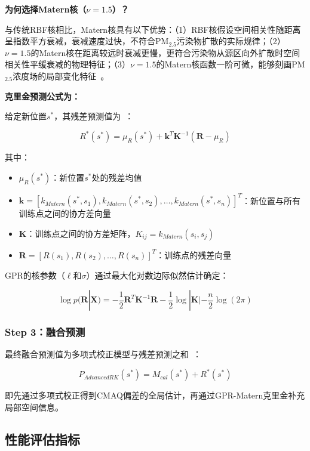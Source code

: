 \documentclass[UTF8, a4paper, 12pt]{article}
\begin{document}
\textbf{为何选择Matern核（$\nu=1.5$）？}

与传统RBF核相比，Matern核具有以下优势：（1）RBF核假设空间相关性随距离呈指数平方衰减，衰减速度过快，不符合PM$_{2.5}$污染物扩散的实际规律；（2）$\nu=1.5$的Matern核在距离较远时衰减更慢，更符合污染物从源区向外扩散时空间相关性平缓衰减的物理特征；（3）$\nu=1.5$的Matern核函数一阶可微，能够刻画PM$_{2.5}$浓度场的局部变化特征~\cite{rasmussen2006gaussian}。

\textbf{克里金预测公式为：}

给定新位置$s^*$，其残差预测值为~\cite{krige1951note}：

\begin{equation}
R^*(s^*) = \mu_R(s^*) + \mathbf{k}^T \mathbf{K}^{-1} (\mathbf{R} - \mu_R)
\end{equation}

其中：
\begin{itemize}
    \item $\mu_R(s^*)$：新位置$s^*$处的残差均值
    \item $\mathbf{k} = [k_{Matern}(s^*, s_1), k_{Matern}(s^*, s_2), \ldots, k_{Matern}(s^*, s_n)]^T$：新位置与所有训练点之间的协方差向量
    \item $\mathbf{K}$：训练点之间的协方差矩阵，$K_{ij} = k_{Matern}(s_i, s_j)$
    \item $\mathbf{R} = [R(s_1), R(s_2), \ldots, R(s_n)]^T$：训练点的残差向量
\end{itemize}

GPR的核参数（$\ell$和$\sigma$）通过最大化对数边际似然估计确定：

\begin{equation}
\log p(\mathbf{R} | \mathbf{X}) = -\frac{1}{2} \mathbf{R}^T \mathbf{K}^{-1} \mathbf{R} - \frac{1}{2} \log |\mathbf{K}| - \frac{n}{2} \log(2\pi)
\end{equation}

\subsubsection{Step 3：融合预测}

最终融合预测值为多项式校正模型与残差预测之和~\cite{wan2022fusion}：

\begin{equation}
P_{AdvancedRK}(s^*) = M_{cal}(s^*) + R^*(s^*)
\end{equation}

即先通过多项式校正得到CMAQ偏差的全局估计，再通过GPR-Matern克里金补充局部空间信息。

\subsection{性能评估指标}
\end{document}
